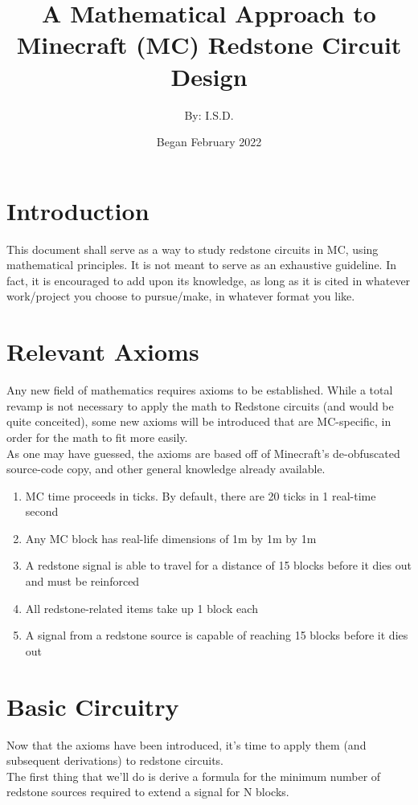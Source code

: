 \documentclass{article}
\title{A Mathematical Approach to Minecraft (MC) Redstone Circuit Design}
\author{By: I.S.D.}
\date{Began February 2022}
\begin{document}
\maketitle

\section{Introduction}

This document shall serve as a way to study redstone circuits in MC, using mathematical principles. It is not meant to serve as an exhaustive guideline. In fact, it is encouraged to add upon its knowledge, as long as it is cited in whatever work/project you choose to pursue/make, in whatever format you like.

\section{Relevant Axioms}
Any new field of mathematics requires axioms to be established. While a total revamp is not necessary to apply the math to Redstone circuits (and would be quite conceited), some new axioms will be introduced that are MC-specific, in order for the math to fit more easily. \\

\noindent
As one may have guessed, the axioms are based off of Minecraft's de-obfuscated source-code copy, and other general knowledge already available.

\begin{enumerate}
\item MC time proceeds in ticks. By default, there are 20 ticks in 1 real-time second
\item Any MC block has real-life dimensions of 1m by 1m by 1m
\item A redstone signal is able to travel for a distance of 15 blocks before it dies out and must be reinforced
\item All redstone-related items take up 1 block each
\item A signal from a redstone source is capable of reaching 15 blocks before it dies out
\end{enumerate}

\section{Basic Circuitry}
Now that the axioms have been introduced, it's time to apply them (and subsequent derivations) to redstone circuits. \\

\noindent
The first thing that we'll do is derive a formula for the minimum number of redstone sources required to extend a signal for N blocks.
\end{document}
